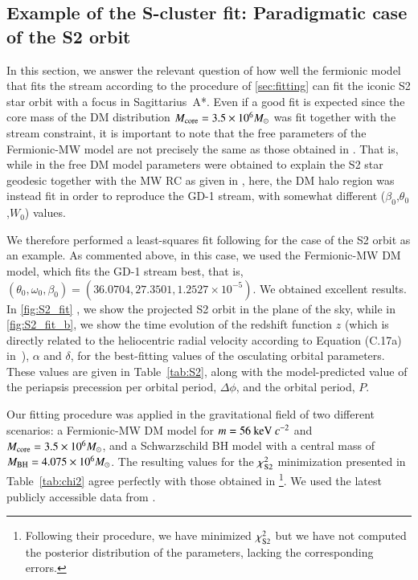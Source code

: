 \documentclass[twocolumn]{aa}
\begin{document}
\subsection{Example of the S-cluster fit: Paradigmatic case of the S2 orbit}
In this section, we answer the relevant question of how well the fermionic model that fits the stream according to the procedure of \cref{sec:fitting} can fit the iconic S2 star orbit with a focus in Sagittarius~A*. Even if a good fit is expected since the core mass of the DM distribution $M_{\rm{core}}=3.5\times 10^6 M_\odot$ was fit together with the stream constraint, it is important to note that the free parameters of the Fermionic-MW model are not precisely the same as those obtained in \cite{2020A&A...641A..34B}. That is, while in \cite{2020A&A...641A..34B} the free DM model parameters were obtained to explain the S2 star geodesic together with the MW RC as given in \cite{sofue_rotation_2013}, here, the DM halo region was instead fit in order to reproduce the GD-1 stream, with somewhat different ($\beta_0$,$\theta_0$,$W_0$) values.

We therefore performed a least-squares fit following \cite{2020A&A...641A..34B} for the case of the S2 orbit as an example. As commented above, in this case, we used the Fermionic-MW DM model, which fits the GD-1 stream best, that is, $(\theta_0, \omega_0, \beta_0)= (36.0704, 27.3501, 1.2527\times10^{-5})$. We obtained excellent results. In \cref{fig:S2_fit} , we show the projected S2 orbit in the plane of the sky, while in \cref{fig:S2_fit_b}, we show the time evolution of the redshift function $z$ (which is directly related to the heliocentric radial velocity according to Equation (C.17a) in~\citealp{2020A&A...641A..34B}), $\alpha$ and $\delta$, for the best-fitting values of the osculating orbital parameters. These values are given in Table~\ref{tab:S2}, along with the model-predicted value of the periapsis precession per orbital period, $\Delta \phi$, and the orbital period, $P$.

Our fitting procedure was applied in the gravitational field of two different scenarios: a Fermionic-MW DM model for $m=56~{\rm keV}~c^{-2}$ and $M_{\rm{core}}=3.5\times 10^6 M_\odot$, and a Schwarzschild BH model with a central mass of $M_{\rm BH}=4.075\times 10^6 M_\odot$.
The resulting values for the $\chi^2_{\rm{S2}}$ minimization presented in Table~\ref{tab:chi2} agree perfectly with those obtained in \cite{2020A&A...641A..34B}\footnote{Following their procedure, we have minimized $\chi^2_{\rm{S2}}$ but we have not computed the posterior distribution of the parameters, lacking the corresponding errors.}.
We used the latest publicly accessible data from \cite{2019Sci...365..664D}.
\end{document}
